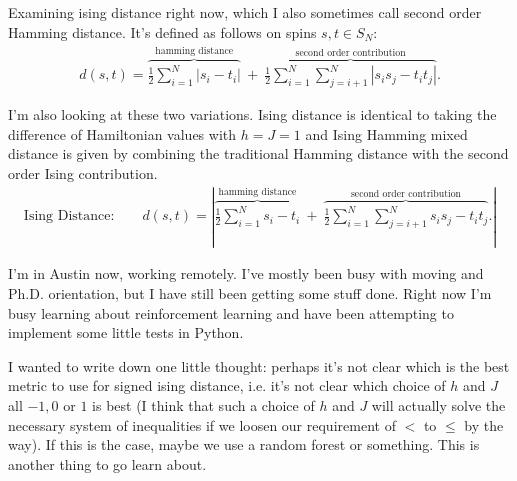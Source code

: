 Examining ising distance right now, which I also sometimes call second order Hamming distance. It's defined as follows on spins $s,t \in S_N$:
\begin{align*}
	d(s,t) = \overbrace{\frac{1}{2} \sum_{i=1}^N | s_i - t_i|}^{\text{hamming distance}} ~+~ \overbrace{\frac{1}{2} \sum_{i=1}^N\sum_{j=i+1}^N |s_is_j - t_it_j|}^{\text{second order contribution}}.
\end{align*}

I'm also looking at these two variations. Ising distance is identical to taking the difference of Hamiltonian values with $h = J = 1$ and Ising Hamming mixed distance is given by combining the traditional Hamming distance with the second order Ising contribution.
\begin{align*}
	\text{Ising Distance:} \hspace{2em} d(s,t) = \left|\overbrace{\frac{1}{2} \sum_{i=1}^N  s_i - t_i}^{\text{hamming distance}} ~+~ \overbrace{\frac{1}{2} \sum_{i=1}^N\sum_{j=i+1}^N s_is_j - t_it_j}^{\text{second order contribution}}.\right|
\end{align*}

 I'm in Austin now, working remotely. I've mostly been busy with moving and Ph.D. orientation, but I have still been getting some stuff done. Right now I'm busy learning about reinforcement learning and have been attempting to implement some little tests in Python.

I wanted to write down one little thought: perhaps it's not clear which is the best metric to use for signed ising distance, i.e. it's not clear which choice of $h$ and $J$ all $-1,0$ or $1$ is best (I think that such a choice of $h$ and $J$ will actually solve the necessary system of inequalities if we loosen our requirement of $<$ to $\leq$ by the way). If this is the case, maybe we use a random forest or something. This is another thing to go learn about.

